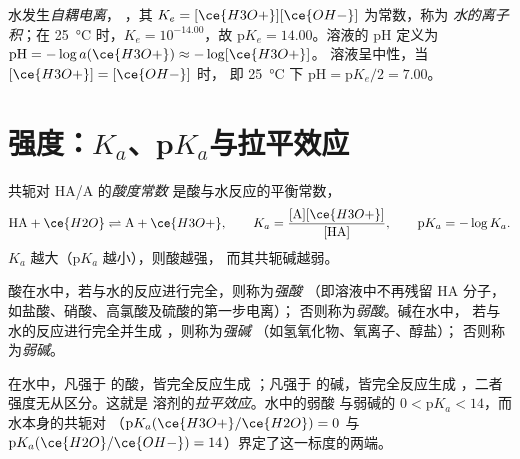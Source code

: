\begin{definition}\label{def:b1:predominant-reaction:autoprotolysis}
水发生\emph{自耦电离}，
，其 $K_e = [\ce{H3O+}][\ce{OH-}]$ 为常数，称为
\emph{水的离子积}；在
\qty{25}{\celsius} 时，$K_e = 10^{-14.00}$，故 $\mathrm{p}K_e = 14.00$。溶液的 pH
定义为 $\mathrm{pH} = -\log a(\ce{H3O+}) \approx -\log[\ce{H3O+}]$。
溶液呈中性，当 $[\ce{H3O+}] = [\ce{OH-}]$ 时，
即 \qty{25}{\celsius} 下 $\mathrm{pH} = \mathrm{p}K_e/2 = 7.00$。
\end{definition}

\section{强度：\texorpdfstring{$K_a$}{Ka}、\texorpdfstring{p$K_a$}{pKa}与拉平效应}

\begin{definition}[酸度常数]\label{def:b1:predominant-reaction:acidity-constant}
共轭对 HA/A 的\emph{酸度常数}
是酸与水反应的平衡常数，
\[
  \mathrm{HA} + \ce{H2O} \rightleftharpoons \mathrm{A} + \ce{H3O+}, \qquad
  K_a = \frac{[\mathrm{A}][\ce{H3O+}]}{[\mathrm{HA}]}, \qquad
  \mathrm{p}K_a = -\log K_a .
\]
$K_a$ 越大（$\mathrm{p}K_a$ 越小），则酸越强，
而其共轭碱越弱。
\end{definition}

\begin{definition}\label{def:b1:predominant-reaction:strong-acid}
酸在水中，若与水的反应进行完全，则称为\emph{强酸}
（即溶液中不再残留 HA 分子，如盐酸、硝酸、高氯酸及硫酸的第一步电离）；
否则称为\emph{弱酸}。碱在水中，
若与水的反应进行完全并生成 ，则称为\emph{强碱}
（如氢氧化物、氧离子、醇盐）；
否则称为\emph{弱碱}。
\end{definition}

\begin{definition}[拉平效应]\label{def:b1:predominant-reaction:levelling}
在水中，凡强于  的酸，皆完全反应生成
；凡强于  的碱，皆完全反应生成
，二者强度无从区分。这就是
溶剂的\emph{拉平效应}。水中的弱酸
与弱碱的 $0 < \mathrm{p}K_a < 14$，而水本身的共轭对
（$\mathrm{p}K_a(\ce{H3O+}/\ce{H2O}) = 0$ 与
$\mathrm{p}K_a(\ce{H2O}/\ce{OH-}) = 14$）界定了这一标度的两端。
\end{definition}

